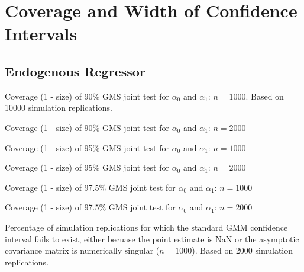 \section{Coverage and Width of Confidence Intervals}
\subsection{Endogenous Regressor}
\begin{table}
  \centering
  
  \caption{Coverage (1 - size) of 90\% GMS joint test for $\alpha_0$ and $\alpha_1$: $n = 1000$. Based on 10000 simulation replications.}
\end{table}


\begin{table}
  \centering
  
  \caption{Coverage (1 - size) of 90\% GMS joint test for $\alpha_0$ and $\alpha_1$: $n = 2000$}
\end{table}
\begin{table}
  \centering
  
  \caption{Coverage (1 - size) of 95\% GMS joint test for $\alpha_0$ and $\alpha_1$: $n = 1000$}
\end{table}


\begin{table}
  \centering
  
  \caption{Coverage (1 - size) of 95\% GMS joint test for $\alpha_0$ and $\alpha_1$: $n = 2000$}
\end{table}
\begin{table}
  \centering
  
  \caption{Coverage (1 - size) of 97.5\% GMS joint test for $\alpha_0$ and $\alpha_1$: $n = 1000$}
\end{table}


\begin{table}
  \centering
  
  \caption{Coverage (1 - size) of 97.5\% GMS joint test for $\alpha_0$ and $\alpha_1$: $n = 2000$}
\end{table}
\begin{table}
  \centering
  
  \caption{Percentage of simulation replications for which the standard GMM confidence interval fails to exist, either becuase the point estimate is NaN or the asymptotic covariance matrix is numerically singular ($n = 1000$). Based on 2000 simulation replications.}
\end{table}


